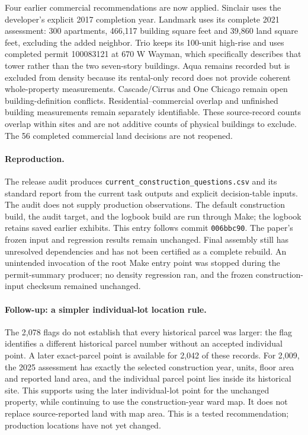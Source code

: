 Four earlier commercial recommendations are now applied. Sinclair uses the developer's explicit 2017 completion year. Landmark uses its complete 2021 assessment: 300 apartments, 466,117 building square feet and 39,860 land square feet, excluding the added neighbor. Trio keeps its 100-unit high-rise and uses completed permit 100083121 at 670 W Wayman, which specifically describes that tower rather than the two seven-story buildings. Aqua remains recorded but is excluded from density because its rental-only record does not provide coherent whole-property measurements. Cascade/Cirrus and One Chicago remain open building-definition conflicts. Residential--commercial overlap and unfinished building measurements remain separately identifiable. These source-record counts overlap within sites and are not additive counts of physical buildings to exclude. The 56 completed commercial land decisions are not reopened.

\paragraph{Reproduction.} The release audit produces \texttt{current\_construction\_questions.csv} and its standard report from the current task outputs and explicit decision-table inputs. The audit does not supply production observations. The default construction build, the audit target, and the logbook build are run through Make; the logbook retains saved earlier exhibits. This entry follows commit \texttt{006bbc90}. The paper's frozen input and regression results remain unchanged. Final assembly still has unresolved dependencies and has not been certified as a complete rebuild. An unintended invocation of the root Make entry point was stopped during the permit-summary producer; no density regression ran, and the frozen construction-input checksum remained unchanged.


\paragraph{Follow-up: a simpler individual-lot location rule.}
The 2,078 flags do not establish that every historical parcel was larger: the flag identifies a different historical parcel number without an accepted individual point. A later exact-parcel point is available for 2,042 of these records. For 2,009, the 2025 assessment has exactly the selected construction year, units, floor area and reported land area, and the individual parcel point lies inside its historical site. This supports using the later individual-lot point for the unchanged property, while continuing to use the construction-year ward map. It does not replace source-reported land with map area. This is a tested recommendation; production locations have not yet changed.

